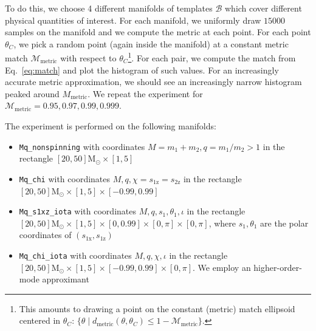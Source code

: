 \documentclass[twocolumn,showpacs,preprintnumbers,nofootinbib,prd,
superscriptaddress,10pt]{revtex4-2}
\begin{document}
To do this, we choose 4 different manifolds of templates $\mathcal{B}$ which cover different physical quantities of interest. For each manifold, we uniformly draw $15000$ samples on the manifold
and we compute the metric at each point.
For each point $\theta_C$, we pick a random point (again inside the manifold) at a constant metric match $\mathcal{M}_{\text{metric}}$ with respect to $\theta_C$\footnote{
This amounts to drawing a point on the constant (metric) match ellipsoid centered in
$\theta_C$: $\{\theta \; | \; d_{\text{metric}}(\theta,\theta_C) \leq 1-\mathcal{M}_{\text{metric}} \}$.
}.
For each pair, we compute the match from Eq.~\eqref{eq:match} and plot the histogram of such values. For an increasingly accurate metric approximation, we should see an increasingly narrow histogram peaked around $M_{\text{metric}}$.
We repeat the experiment for $\mathcal{M}_{\text{metric}} = 0.95, 0.97, 0.99, 0.999$.

The experiment is performed on the following manifolds:
\begin{itemize}
	\item \texttt{Mq\_nonspinning} with coordinates $M = m_1+m_2, q = m_1/m_2>1$ in the rectangle $[20, 50] \mathrm{M_\odot} \times [1,5]$ %
	\item \texttt{Mq\_chi} with coordinates $M, q, \chi = s_\text{1z} = s_\text{2z}$ in the rectangle $[20, 50] \mathrm{M_\odot} \times [1,5] \times [-0.99, 0.99]$
	\item \texttt{Mq\_s1xz\_iota} with coordinates $M, q, s_\text{1}, \theta_1, \iota$ in the rectangle $[20, 50] \mathrm{M_\odot} \times [1,5] \times [0, 0.99] \times [0,\pi]  \times [0,\pi]$, where $s_1, \theta_1$ are the polar coordinates of $(s_\text{1x}, s_\text{1z})$
	\item \texttt{Mq\_chi\_iota} with coordinates $M, q, \chi, \iota$ in the rectangle $[20, 50] \mathrm{M_\odot} \times [1,5] \times [-0.99, 0.99] \times [0,\pi]$. We employ an higher-order-mode approximant
\end{itemize}
\end{document}
